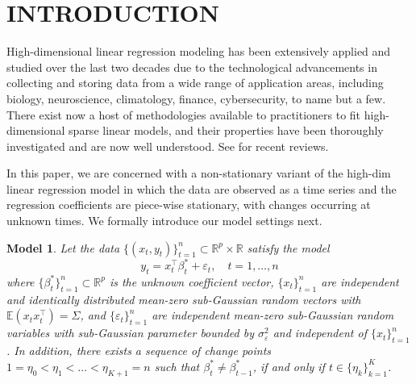 \documentclass[twoside]{article}
\newtheorem{model}{Model}
\begin{document}
\section{INTRODUCTION}\label{sec-intro}

High-dimensional linear regression  modeling has been extensively applied and studied over the last two decades due to the technological advancements in collecting and storing data from a wide range of application areas, including biology, neuroscience, climatology, finance, cybersecurity, to name but a few. There exist now a host of methodologies available to practitioners to fit high-dimensional sparse linear models, and their properties have been thoroughly investigated and are now well understood. See \cite{buhlmann2011statistics} for recent reviews. %

In this paper, we are concerned with a non-stationary variant of the high-dim linear regression model in which the data are observed as a time series and the regression coefficients are piece-wise stationary, with changes occurring at unknown times. We formally introduce our model settings next.

\begin{model}\label{assume:change point regression model}
	Let the data  $\{(x_t, y_t)\}_{t = 1}^n \subset \mathbb{R}^p \times \mathbb{R}$ satisfy the model
		\[
			y_t = x_t^\top \beta_t^* + \varepsilon_t, \quad t =1, \ldots, n
		\]
		where $\{\beta_t^*\}_{t = 1}^n \subset \mathbb{R}^p$ is the unknown coefficient vector, $\{x_t\}_{t = 1}^n$ are independent and identically distributed mean-zero sub-Gaussian random  vectors with $\mathbb{E}(x_t x_t^{\top}) = \Sigma$,  and $\{\varepsilon_t\}_{t = 1}^n$ are independent mean-zero sub-Gaussian random variables with sub-Gaussian parameter bounded by $\sigma_{\varepsilon}^2$ and independent of $\{x_t\}_{t=1}^n$. 
	In addition, there exists a sequence of change points $1 = \eta_0 < \eta_1 < 
	\ldots < \eta_{K+1} = n$ such that $\beta_t^* \neq \beta_{t - 1}^*$, if and only if $t \in \{\eta_k\}_{k = 1}^K$.
\end{model} 
\end{document}
